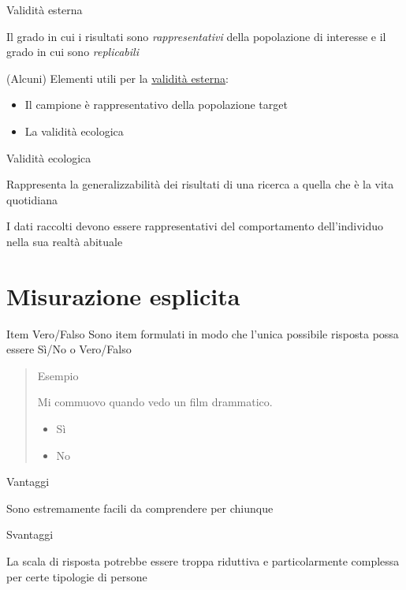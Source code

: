 \documentclass[compress]{beamer}
\begin{document}
\begin{frame}
	\begin{block}{Validità esterna}
		
		Il grado in cui i risultati sono \emph{rappresentativi} della popolazione di interesse e il grado in cui sono \emph{replicabili}
		
			(Alcuni) Elementi utili per la \underline{validità esterna}:
		\begin{itemize}
			\item Il campione è rappresentativo della popolazione target
			\item La validità ecologica
		\end{itemize} 
	\end{block}
	
	\pause
		\begin{block}{Validità ecologica}
		
		Rappresenta la generalizzabilità dei risultati di una ricerca a quella che è la vita quotidiana 
		
		I dati raccolti devono essere rappresentativi del comportamento dell’individuo nella sua realtà abituale
		
	\end{block}
\end{frame}

\section[Misurazione esplicita]{Misurazione esplicita}

\begin{frame}{Item Vero/Falso}
	Sono item formulati in modo che l'unica possibile risposta possa essere Sì/No o Vero/Falso 
	
	\begin{quote}{Esempio}
		
		Mi commuovo quando vedo un film drammatico.
		\begin{itemize}
			\item Sì
			\item No
		\end{itemize}
	\end{quote}
	
	\begin{exampleblock}{Vantaggi}
		
		Sono estremamente facili da comprendere per chiunque 
	\end{exampleblock}
	
	\begin{alertblock}{Svantaggi}
		
		La scala di risposta potrebbe essere troppa riduttiva e particolarmente complessa per certe tipologie di persone
	\end{alertblock}
\end{frame}
\end{document}
